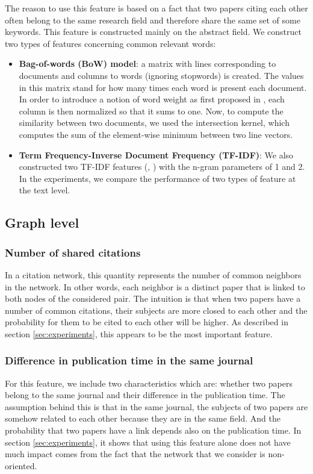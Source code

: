 \documentclass{article}
\begin{document}
The reason to use this feature is based on a fact that two papers citing each other often belong to the same research field and therefore share the same set of some keywords. This feature is constructed mainly on the abstract field. We construct two types of features concerning common relevant words:
\begin{itemize}
\item \textbf{Bag-of-words (BoW) model}: a matrix with lines corresponding to documents and columns to words (ignoring stopwords) is created. The values in this matrix stand for how many times each word is present each document. In order to introduce a notion of word weight as first proposed in \cite{sparck1972statistical}, each column is then normalized so that it sums to one. Now, to compute the similarity between two documents, we used the intersection kernel, which computes the sum of the element-wise minimum between two line vectors.
\item \textbf{Term Frequency-Inverse Document Frequency (TF-IDF)}: We also constructed two TF-IDF features (\cite{Singhal:1996}, \cite{Wu:2008}) with the n-gram parameters of 1 and 2. In the experiments, we compare the performance of two types of feature at the text level.
\end{itemize}
\subsection{Graph level}
\subsubsection{Number of shared citations}

In a citation network, this quantity represents the number of common neighbors in the network. In other words, each neighbor is a distinct paper that is linked to both nodes of the considered pair. The intuition is that when two papers have a number of common citations, their subjects are more closed to each other and the probability for them to be cited to each other will be higher. As described in section \ref{sec:experiments}, this appears to be the most important feature.

\subsubsection{Difference in publication time in the same journal}

For this feature, we include two characteristics which are: whether two papers belong to the same journal and their difference in the publication time. The assumption behind this is that in the same journal, the subjects of two papers are somehow related to each other because they are in the same field. And the probability that two papers have a link depends also on the publication time. In section \ref{sec:experiments}, it shows that using this feature alone does not have much impact comes from the fact that the network that we consider is non-oriented.
\end{document}
